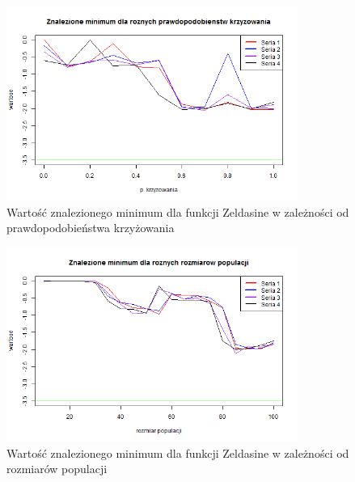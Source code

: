 \documentclass[11pt, a4paper]{article}
\begin{document}
\begin{figure}[H]
	\begin{center}
		\includegraphics[width=0.85\textwidth]{./assets/Zeldasine203.png}
		\caption{Wartość znalezionego minimum dla funkcji Zeldasine w zależności od prawdopodobieństwa krzyżowania}
		\label{fig:zeldasine3}
	\end{center}
\end{figure}

\begin{figure}[H]
	\begin{center}
		\includegraphics[width=0.85\textwidth]{./assets/Zeldasine204.png}
		\caption{Wartość znalezionego minimum dla funkcji Zeldasine w zależności od rozmiarów populacji}
		\label{fig:zeldasine4}
	\end{center}
\end{figure}
\end{document}
